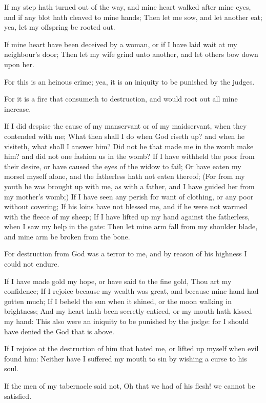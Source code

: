 \Verse If my step hath turned out of the way, and mine heart walked after mine eyes, and if any blot hath cleaved to mine hands; \Verse Then let me sow, and let another eat; yea, let my offspring be rooted out.

\Verse If mine heart have been deceived by a woman, or if I have laid wait at my neighbour's door; \Verse Then let my wife grind unto another, and let others bow down upon her.

\Verse For this is an heinous crime; yea, it is an iniquity to be punished by the judges.

\Verse For it is a fire that consumeth to destruction, and would root out all mine increase.

\Verse If I did despise the cause of my manservant or of my maidservant, when they contended with me; \Verse What then shall I do when God riseth up? and when he visiteth, what shall I answer him?  \Verse Did not he that made me in the womb make him? and did not one fashion us in the womb?  \Verse If I have withheld the poor from their desire, or have caused the eyes of the widow to fail; \Verse Or have eaten my morsel myself alone, and the fatherless hath not eaten thereof; \Verse (For from my youth he was brought up with me, as with a father, and I have guided her from my mother's womb;) \Verse If I have seen any perish for want of clothing, or any poor without covering; \Verse If his loins have not blessed me, and if he were not warmed with the fleece of my sheep; \Verse If I have lifted up my hand against the fatherless, when I saw my help in the gate: \Verse Then let mine arm fall from my shoulder blade, and mine arm be broken from the bone.

\Verse For destruction from God was a terror to me, and by reason of his highness I could not endure.

\Verse If I have made gold my hope, or have said to the fine gold, Thou art my confidence; \Verse If I rejoice because my wealth was great, and because mine hand had gotten much; \Verse If I beheld the sun when it shined, or the moon walking in brightness; \Verse And my heart hath been secretly enticed, or my mouth hath kissed my hand: \Verse This also were an iniquity to be punished by the judge: for I should have denied the God that is above.

\Verse If I rejoice at the destruction of him that hated me, or lifted up myself when evil found him: \Verse Neither have I suffered my mouth to sin by wishing a curse to his soul.

\Verse If the men of my tabernacle said not, Oh that we had of his flesh!  we cannot be satisfied.


